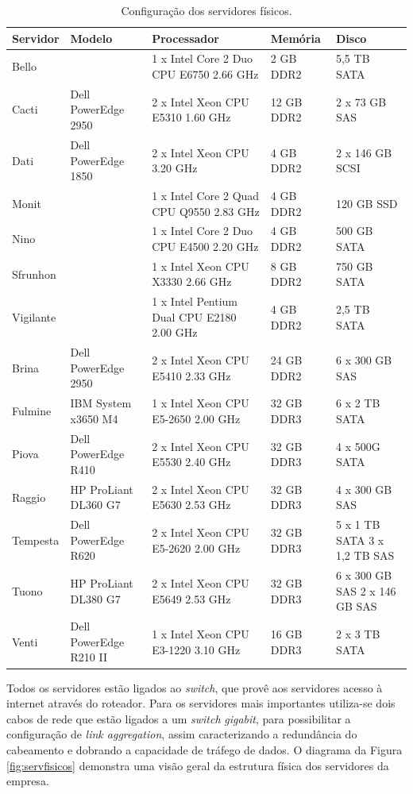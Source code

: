 \begin{table}
\caption{Configuração dos servidores físicos.}
\label{tab:servfisicos}
\begin{center}
\begin{tabular}{|l|l|p{4cm}|l|p{2.1cm}|}\hline
Servidor & Modelo & Processador & Memória & Disco\\\hline
Bello & & 1 x Intel Core 2 Duo CPU E6750 2.66 GHz & 2 GB DDR2 & 5,5 TB SATA\\\hline
Cacti & Dell PowerEdge 2950 & 2 x Intel Xeon CPU E5310 1.60 GHz & 12 GB DDR2 & 2 x 73 GB SAS\\\hline
Dati & Dell PowerEdge 1850 & 2 x Intel Xeon CPU 3.20 GHz & 4 GB DDR2 & 2 x 146 GB SCSI\\\hline
Monit & & 1 x Intel Core 2 Quad CPU Q9550 2.83 GHz & 4 GB DDR2 & 120 GB SSD\\\hline
Nino & & 1 x Intel Core 2 Duo CPU E4500 2.20 GHz & 4 GB DDR2 & 500 GB SATA\\\hline
Sfrunhon & & 1 x Intel Xeon CPU X3330 2.66 GHz & 8 GB DDR2 & 750 GB SATA\\\hline
Vigilante & & 1 x Intel Pentium Dual CPU E2180 2.00 GHz & 4 GB DDR2 & 2,5 TB SATA\\\hline
Brina & Dell PowerEdge 2950 & 2 x Intel Xeon CPU E5410 2.33 GHz & 24 GB DDR2 & 6 x 300 GB SAS\\\hline
Fulmine & IBM System x3650 M4 & 1 x Intel Xeon CPU E5-2650 2.00 GHz & 32 GB DDR3 & 6 x 2 TB SATA\\\hline
Piova & Dell PowerEdge R410 & 2 x Intel Xeon CPU E5530 2.40 GHz & 32 GB DDR3 & 4 x 500G SATA\\\hline
Raggio & HP ProLiant DL360 G7 & 2 x  Intel Xeon CPU E5630 2.53 GHz & 32 GB DDR3 & 4 x 300 GB SAS\\\hline
Tempesta & Dell PowerEdge R620 & 2 x Intel Xeon CPU E5-2620 2.00 GHz & 32 GB DDR3 & 5 x 1 TB SATA 3 x 1,2 TB SAS\\\hline
Tuono & HP ProLiant DL380 G7 & 2 x Intel Xeon CPU E5649 2.53 GHz & 32 GB DDR3 & 6 x 300 GB SAS 2 x 146 GB SAS\\\hline
Venti & Dell PowerEdge R210 II & 1 x Intel Xeon CPU E3-1220 3.10 GHz & 16 GB DDR3 & 2 x 3 TB SATA\\\hline
\end{tabular}
\end{center}
\end{table}

Todos os servidores estão ligados ao \textit{switch}, que provê aos servidores acesso à internet através do roteador. 
Para os servidores mais importantes utiliza-se dois cabos de rede que estão ligados a um \textit{switch} \textit{gigabit}, para possibilitar a 
configuração de \textit{link aggregation}, assim caracterizando a redundância do cabeamento e dobrando a capacidade de tráfego de dados.
O diagrama da Figura \ref{fig:servfisicos} demonstra uma visão geral da estrutura física dos servidores da empresa. 

